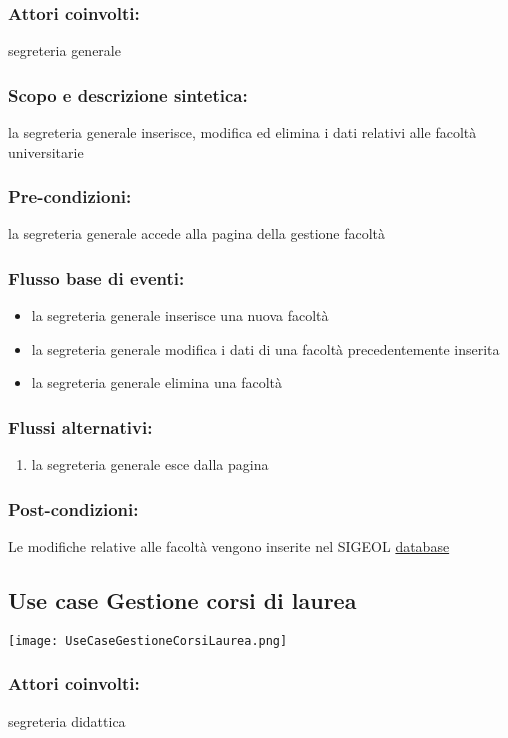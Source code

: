 \documentclass[11pt,a4paper]{article}
\begin{document}
\subsubsection*{Attori coinvolti:}
segreteria generale
\subsubsection*{Scopo e descrizione sintetica:}
la segreteria generale inserisce, modifica ed elimina i dati relativi alle facoltà universitarie
\subsubsection*{Pre-condizioni:}
la segreteria generale accede alla pagina della gestione facoltà
\subsubsection*{Flusso base di eventi:}
\begin{itemize}
 \item la segreteria generale inserisce una nuova facoltà
 \item la segreteria generale modifica i dati di una facoltà precedentemente inserita
 \item la segreteria generale elimina una facoltà
\end{itemize}
\subsubsection*{Flussi alternativi:}
\begin{enumerate} 
 \item la segreteria generale esce dalla pagina
\end{enumerate}
\subsubsection*{Post-condizioni:}
Le modifiche relative alle facoltà vengono inserite nel SIGEOL \underline{database}

\subsection{Use case Gestione corsi di laurea}
\begin{center} 
 \texttt{[image: UseCaseGestioneCorsiLaurea.png]}
\end{center}
\subsubsection*{Attori coinvolti:}
segreteria didattica
\end{document}
